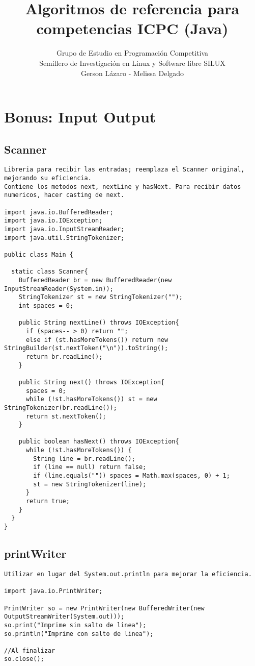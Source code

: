 \documentclass[10pt,letterpaper,twocolumn,twosided]{article}
\begin{document}
\title{Algoritmos de referencia para competencias ICPC (Java)}
\author{Grupo de Estudio en Programación Competitiva \\ Semillero de Investigación en Linux y Software libre SILUX \\ Gerson Lázaro - Melissa Delgado}
\maketitle
\tableofcontents
{}


\section{Bonus: Input Output}

\subsection{Scanner}
\begin{lstlisting}
Libreria para recibir las entradas; reemplaza el Scanner original, mejorando su eficiencia. 
Contiene los metodos next, nextLine y hasNext. Para recibir datos numericos, hacer casting de next.

import java.io.BufferedReader;
import java.io.IOException;
import java.io.InputStreamReader;
import java.util.StringTokenizer;

public class Main {
    
  static class Scanner{
    BufferedReader br = new BufferedReader(new InputStreamReader(System.in));
    StringTokenizer st = new StringTokenizer("");
    int spaces = 0;

    public String nextLine() throws IOException{
      if (spaces-- > 0) return "";
      else if (st.hasMoreTokens()) return new StringBuilder(st.nextToken("\n")).toString();
      return br.readLine();
    }

    public String next() throws IOException{
      spaces = 0;
      while (!st.hasMoreTokens()) st = new StringTokenizer(br.readLine());
      return st.nextToken();
    }

    public boolean hasNext() throws IOException{
      while (!st.hasMoreTokens()) {
        String line = br.readLine();
        if (line == null) return false;
        if (line.equals("")) spaces = Math.max(spaces, 0) + 1;
        st = new StringTokenizer(line);
      }
      return true;
    }
  }
}\end{lstlisting}

\subsection{printWriter}
\begin{lstlisting}
Utilizar en lugar del System.out.println para mejorar la eficiencia.

import java.io.PrintWriter;

PrintWriter so = new PrintWriter(new BufferedWriter(new OutputStreamWriter(System.out)));
so.print("Imprime sin salto de linea");
so.println("Imprime con salto de linea");

//Al finalizar
so.close();
\end{lstlisting}
\end{document}
